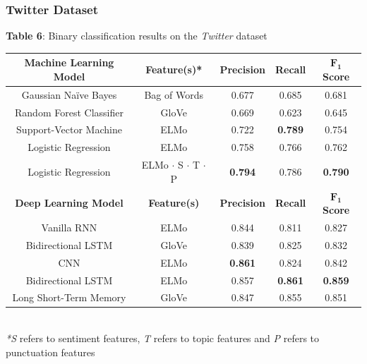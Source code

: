 \documentclass[12pt,a4paper]{article}
\begin{document}
\subsubsection{Twitter Dataset}

\begin{center}
	\textbf{Table 6}: Binary classification results on the \textit{Twitter} dataset\vspace{-5pt}
\end{center}

\begin{center}
	\begin{tabular}{c||c|c|c|c}
		\hline
		\textbf{Machine Learning Model}& \textbf{Feature(s)*} & \textbf{Precision} & \textbf{Recall} & \textbf{$\mathbf{F_1}$ Score}\\
		\hline\hline
		Gaussian Na\"{i}ve Bayes & Bag of Words & 0.677 & 0.685 & 0.681\\
		Random Forest Classifier & GloVe  & 0.669   & 0.623 & 0.645\\
		Support-Vector Machine & ELMo  & 0.722 & \textbf{0.789} & 0.754\\
		Logistic Regression & ELMo  & 0.758 & 0.766 & 0.762\\
		Logistic Regression & ELMo $\cdot$ S $\cdot$ T $\cdot$ P & \textbf{0.794} & 0.786 & \textbf{0.790}\\
		\hline\hline
		\textbf{Deep Learning Model}& \textbf{Feature(s)} & \textbf{Precision} & \textbf{Recall} & \textbf{$\mathbf{F_1}$ Score}\\
		\hline
		Vanilla RNN & ELMo  & 0.844   & 0.811 & 0.827\\
		Bidirectional LSTM & GloVe  & 0.839 & 0.825 & 0.832\\
		CNN & ELMo  & \textbf{0.861}   & 0.824 & 0.842\\
		Bidirectional LSTM & ELMo  & 0.857   & \textbf{0.861} & \textbf{0.859}\\
		Long Short-Term Memory & GloVe & 0.847   & 0.855 & 0.851\\
		\hline
	\end{tabular}
	\\\vspace{5pt}
	\textit{*S} refers to sentiment features, \textit{T} refers to topic features and \textit{P} refers to punctuation features\\\vspace{-5pt}
\end{center}
\end{document}
